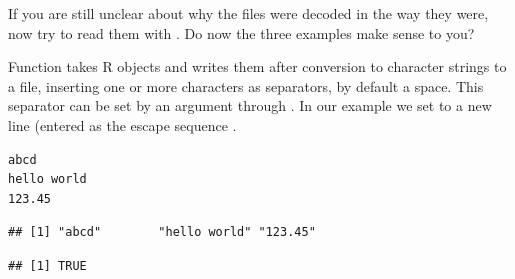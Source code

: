\documentclass[krantz2,ChapterTOCs]{krantz}\usepackage{knitr}
\begin{document}
\begin{playground}
If you are still unclear about why the files were decoded in the way they were, now try to read them with . Do now the three examples make sense to you?
\end{playground}

Function  takes R objects and writes them after conversion to character strings to a file, inserting one or more characters as separators, by default a space. This separator can be set by an argument through . In our example we set  to a new line (entered as the escape sequence .

\begin{knitrout}\footnotesize
{}\color{fgcolor}\begin{kframe}
\begin{alltt}
 \hlkwb{<-} \hlstd{(}\hlstd{,} \hlstd{,} \hlstd{)}
  \hlstd{=} \hlstd{,}  \hlstd{=} \hlstd{)}
\hlstd{(}\hlstd{,}  \hlstd{=} \hlstd{)}
\end{alltt}
\end{kframe}
\end{knitrout}

\begin{knitrout}\footnotesize
{}\color{fgcolor}\begin{kframe}
\begin{verbatim}
abcd
hello world
123.45
\end{verbatim}
\end{kframe}
\end{knitrout}

\begin{knitrout}\footnotesize
{}\color{fgcolor}\begin{kframe}
\begin{alltt}
 \hlkwb{<-} \hlstd{(}\hlstd{)}
\end{alltt}
\begin{verbatim}
## [1] "abcd"        "hello world" "123.45"
\end{verbatim}
\begin{alltt}
  \hlstd{=} \hlstd{)}
\end{alltt}
\begin{verbatim}
## [1] TRUE
\end{verbatim}
\end{kframe}
\end{knitrout}
\end{document}
